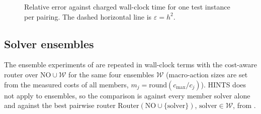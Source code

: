 \begin{figure}[H]
\color{red}
    \centering
    \caption{Relative error against charged wall-clock time for one test instance per pairing. The dashed horizontal line is $\varepsilon = h^2$.}
    \label{fig:ca_convergence}
\end{figure}


\subsection{Solver ensembles}

The ensemble experiments of  are repeated in wall-clock terms with the cost-aware router over $\mathrm{NO}\cup\mathcal{W}$ for the same four ensembles $\mathcal{W}$ (macro-action sizes are set from the measured costs of all members, $m_j = \mathrm{round}(c_{\max}/c_j)$). HINTS does not apply to ensembles, so the comparison is against every member solver alone and against the best pairwise router $\mathrm{Router}(\mathrm{NO}\cup\{\text{solver}\})$, $\text{solver}\in\mathcal{W}$, from .

